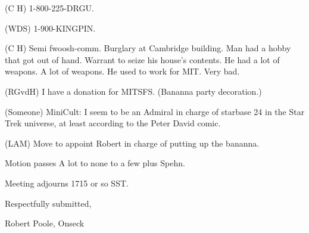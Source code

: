 (C H) 1-800-225-DRGU.

(WDS) 1-900-KINGPIN.

(C H) Semi fwoosh-comm.  Burglary at Cambridge building.  Man had a hobby that
got out of hand.  Warrant to seize his house's contents.  He had a lot of
weapons.  A lot of weapons.  He used to work for MIT.  Very bad.

(RGvdH) I have a donation for MITSFS.  (Bananna party decoration.)

(Someone) MiniCult:  I seem to be an Admiral in charge of starbase 24 in the
Star Trek universe, at least according to the Peter David comic.

(LAM) Move to appoint Robert in charge of putting up the bananna.

Motion passes A lot to none to a few plus Spehn.


Meeting adjourns 1715 or so SST.

\vspace{0.15in}
\begin{center}
Respectfully submitted,

Robert Poole, Onseck
\end{center}


